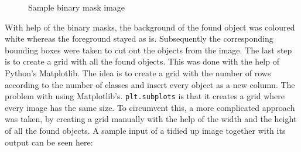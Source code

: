 \begin{figure}[H]
	\caption{\label{fig:binary-mask} Sample binary mask image}
\end{figure}

With help of the binary masks, the background of the found object was coloured white whereas the foreground stayed as is. Subsequently the corresponding bounding boxes were taken to cut out the objects from the image. The last step is to create a grid with all the found objects. This was done with the help of Python's Matplotlib. The idea is to create a grid with the number of rows according to the number of classes and insert every object as a new column. The problem with using Matplotlib's. \texttt{plt.subplots} is that it creates a grid where every image has the same size. To circumvent this, a more complicated approach was taken, by creating a grid manually with the help of the width and the height of all the found objects. A sample input of a tidied up image together with its output can be seen here:

